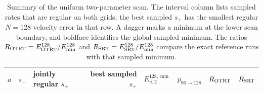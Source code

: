 \begin{table}[htbp]
\centering

\scriptsize
\setlength{\tabcolsep}{3.0pt}
\caption{Summary of the uniform two-parameter scan.  The interval column lists sampled rates that are regular on both grids; the best sampled $s_{+}$ has the smallest regular $N=128$ velocity error in that row.  A dagger marks a minimum at the lower scan boundary, and boldface identifies the global sampled minimum.  The ratios $R_{\rm OTRT}=E_{\rm OTRT}^{128}/E_{\min}^{128}$ and $R_{\rm SRT}=E_{\rm SRT}^{128}/E_{\min}^{128}$ compare the exact reference runs with that sampled minimum.}
\label{tab:numerical-tg-parameter-summary}
\begin{tabular}{@{}rrlrrrrr@{}}
\toprule
$a$ & $s_-$ & jointly regular $s_{+}$ & best sampled $s_{+}$ & $E_{u,2}^{128,\min}$ & $p_{96\to128}$ & $R_{\rm OTRT}$ & $R_{\rm SRT}$\\
\midrule
\bottomrule
\end{tabular}
\end{table}
